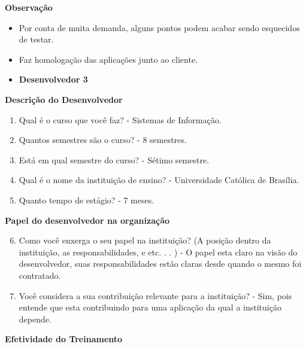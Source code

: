 \begin{apendicesenv}
\textbf{Observação}

\begin{itemize}
	\item Por conta de muita demanda, alguns pontos podem acabar sendo esquecidos de testar.
	\item Faz homologação das aplicações junto ao cliente.
\end{itemize}


\begin{itemize}
	\item \textbf{Desenvolvedor 3}
\end{itemize}

\textbf{Descrição do Desenvolvedor}

\begin{enumerate}
	\item Qual é o curso que você faz?\newline
	- Sistemas de Informação.
	\item Quantos semestres são o curso?\newline
	- 8 semestres.
	\item Está em qual semestre do curso?\newline
	- Sétimo semestre.
	\item Qual é o nome da instituição de ensino?\newline
	- Universidade Católica de Brasília.
	\item Quanto tempo de estágio?\newline
	- 7 meses.
\end{enumerate}

\textbf{Papel do desenvolvedor na organização}

\begin{enumerate}
	\setcounter{enumi}{5}
	\item Como você enxerga o seu papel na instituição? (A posição dentro da instituição, as
	responsabilidades, e etc. . . )\newline
	- O papel esta claro na visão do desenvolvedor, suas responsabilidades estão claras desde quando o mesmo foi contratado.
	\item Você considera a sua contribuição relevante para a instituição?\newline
	- Sim, pois entende que esta contribuindo para uma aplicação da qual a instituição depende.
\end{enumerate}

\textbf{Efetividade do Treinamento}


\end{apendicesenv}
